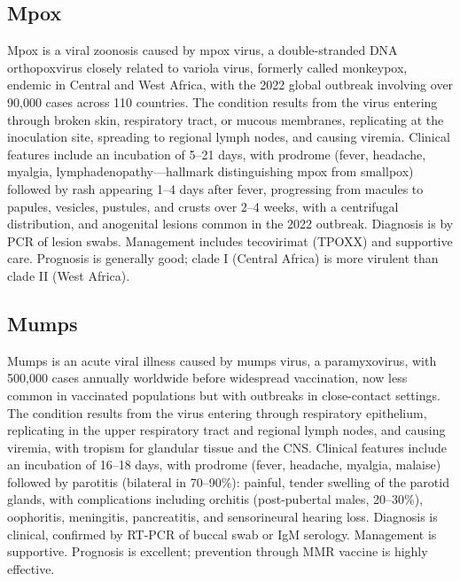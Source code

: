 \subsection{Mpox}
\label{sec:Mpox}
Mpox is a viral zoonosis caused by mpox virus, a double-stranded DNA orthopoxvirus closely related to variola virus, formerly called monkeypox, endemic in Central and West Africa, with the 2022 global outbreak involving over 90,000 cases across 110 countries. The condition results from the virus entering through broken skin, respiratory tract, or mucous membranes, replicating at the inoculation site, spreading to regional lymph nodes, and causing viremia. Clinical features include an incubation of 5--21 days, with prodrome (fever, headache, myalgia, lymphadenopathy---hallmark distinguishing mpox from smallpox) followed by rash appearing 1--4 days after fever, progressing from macules to papules, vesicles, pustules, and crusts over 2--4 weeks, with a centrifugal distribution, and anogenital lesions common in the 2022 outbreak. Diagnosis is by PCR of lesion swabs. Management includes tecovirimat (TPOXX) and supportive care. Prognosis is generally good; clade I (Central Africa) is more virulent than clade II (West Africa).

\subsection{Mumps}
\label{sec:Mumps}
Mumps is an acute viral illness caused by mumps virus, a paramyxovirus, with 500,000 cases annually worldwide before widespread vaccination, now less common in vaccinated populations but with outbreaks in close-contact settings. The condition results from the virus entering through respiratory epithelium, replicating in the upper respiratory tract and regional lymph nodes, and causing viremia, with tropism for glandular tissue and the CNS. Clinical features include an incubation of 16--18 days, with prodrome (fever, headache, myalgia, malaise) followed by parotitis (bilateral in 70--90\%): painful, tender swelling of the parotid glands, with complications including orchitis (post-pubertal males, 20--30\%), oophoritis, meningitis, pancreatitis, and sensorineural hearing loss. Diagnosis is clinical, confirmed by RT-PCR of buccal swab or IgM serology. Management is supportive. Prognosis is excellent; prevention through MMR vaccine is highly effective.

